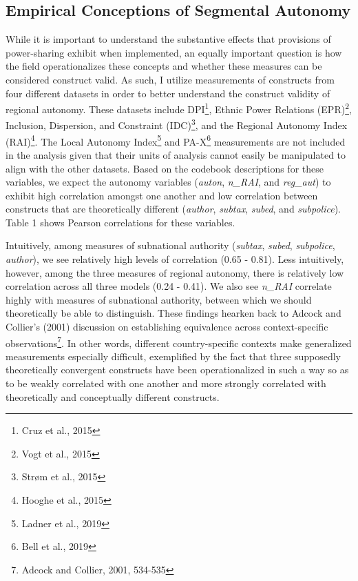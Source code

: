 \documentclass[12pt]{article}
\begin{document}
\subsection{Empirical Conceptions of Segmental Autonomy}
While it is important to understand the substantive effects that provisions of power-sharing exhibit when implemented, an equally important question is how the field operationalizes these concepts and whether these measures can be considered construct valid. As such, I utilize measurements of constructs from four different datasets in order to better understand the construct validity of regional autonomy. These datasets include DPI\footnote{Cruz et al., 2015}, Ethnic Power Relations (EPR)\footnote{Vogt et al., 2015}, Inclusion, Dispersion, and Constraint (IDC)\footnote{Strøm et al., 2015}, and the Regional Autonomy Index (RAI)\footnote{Hooghe et al., 2015}. The Local Autonomy Index\footnote{Ladner et al., 2019} and PA-X\footnote{Bell et al., 2019} measurements are not included in the analysis given that their units of analysis cannot easily be manipulated to align with the other datasets. Based on the codebook descriptions for these variables, we expect the autonomy variables (\textit{auton}, \textit{n\_RAI}, and \textit{reg\_aut}) to exhibit high correlation amongst one another and low correlation between constructs that are theoretically different (\textit{author}, \textit{subtax}, \textit{subed}, and \textit{subpolice}). Table 1 shows Pearson correlations for these variables.

Intuitively, among measures of subnational authority (\textit{subtax}, \textit{subed}, \textit{subpolice}, \textit{author}), we see relatively high levels of correlation (0.65 - 0.81). Less intuitively, however, among the three measures of regional autonomy, there is relatively low correlation across all three models (0.24 - 0.41). We also see \textit{n\_RAI} correlate highly with measures of subnational authority, between which we should theoretically be able to distinguish. These findings hearken back to Adcock and Collier's (2001) discussion on establishing equivalence across context-specific observations\footnote{Adcock and Collier, 2001, 534-535}. In other words, different country-specific contexts make generalized measurements especially difficult, exemplified by the fact that three supposedly theoretically convergent constructs have been operationalized in such a way so as to be weakly correlated with one another and more strongly correlated with theoretically and conceptually different constructs.
\end{document}

